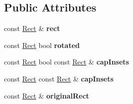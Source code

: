 \subsection*{Public Attributes}
\begin{DoxyCompactItemize}
\item 
\mbox{\label{classui_1_1Scale9Sprite_af0542cc17c788856ef1ceb1a442b3956}} 
const \hyperlink{classRect}{Rect} \& {\bfseries rect}
\item 
\mbox{\label{classui_1_1Scale9Sprite_aeee960fbca3b7b15a76eefda755ff27b}} 
const \hyperlink{classRect}{Rect} bool {\bfseries rotated}
\item 
\mbox{\label{classui_1_1Scale9Sprite_aae084db2b42e62c7e0ea508da8d525bd}} 
const \hyperlink{classRect}{Rect} bool const \hyperlink{classRect}{Rect} \& {\bfseries cap\+Insets}
\item 
\mbox{\label{classui_1_1Scale9Sprite_aa14d5b247370afdb4443d190a3ee39bf}} 
const \hyperlink{classRect}{Rect} const \hyperlink{classRect}{Rect} \& {\bfseries cap\+Insets}
\item 
\mbox{\label{classui_1_1Scale9Sprite_aee7e56943d00ec5c1a2104049d28665b}} 
const \hyperlink{classRect}{Rect} \& {\bfseries original\+Rect}
\end{DoxyCompactItemize}
